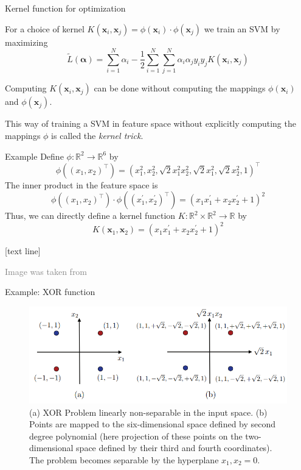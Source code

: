 \documentclass[dvipsnames]{beamer}
\newcommand{\referencefootnote}[1]{\setbeamertemplate{footline}[text line]{%
\parbox{0.9\paperwidth}{\vspace*{-23pt}\tiny{\textcolor{gray}{#1}}\hfill\scriptsize\insertframenumber}}}
\begin{document}
			\begin{frame}{Kernel function for optimization}
			
			For a choice of kernel $K(\mathbf{x}_i,\mathbf{x}_j) = \phi(\mathbf{x}_i)\cdot \phi(\mathbf{x}_j)$ we train an SVM by maximizing
       			\[
			\widetilde{L}(\boldsymbol{\alpha}) = \sum_{i=1}^N\alpha_i - \frac{1}{2}\sum_{i=1}^N\sum_{j=1}^N\alpha_i\alpha_j y_i y_j K(\mathbf{x}_i,\mathbf{x}_j)
			\]
			
			Computing $K(\mathbf{x}_i,\mathbf{x}_j)$ can be done without computing the mappings $\phi(\mathbf{x}_i)$ and $\phi(\mathbf{x}_j)$.
			
			This way of training a SVM in feature space without explicitly computing the mappings $\phi$ is called the \emph{kernel trick}. 
			\end{frame}
			
			\begin{frame}{Example}
        Define $\phi:\mathbb{R}^2 \rightarrow \mathbb{R}^6$ by
				\[
				\phi((x_1,x_2)^{\top}) = (x_1^2,x_2^2,\sqrt{2}x_1^2 x_2^2, \sqrt{2}x_1^2,\sqrt{2}x_2^2, 1)^{\top}
				\]
				The inner product in the feature space is
				\[
				\phi((x_1,x_2)^{\top})\cdot \phi((x^{'}_1,x^{'}_2)^{\top}) = (x_1 x_1^{'} + x_2 x_2^{'}+ 1)^2
				\]
				Thus, we can directly define a kernel function $K:\mathbb{R}^2 \times \mathbb{R}^2 \rightarrow \mathbb{R}$ by
				\[
				K(\mathbf{x}_1,\mathbf{x}_2) = (x_1 x_1^{'} + x_2 x_2^{'}+ 1)^2
				\]
			\end{frame}
			
			{ \referencefootnote{Image was taken from \cite{mohri_fom}}
			\begin{frame}{Example: XOR function}
        \begin{figure}
					\center
					\includegraphics[scale=.5]{figures/xor.png}
           \caption{(a) XOR Problem linearly non-separable in the input space. (b) Points are mapped to the six-dimensional space defined by second degree polynomial (here projection of these points on the two-dimensional space defined by their third and fourth coordinates). The problem becomes separable by the hyperplane $x_1,x_2 = 0$.}
        \end{figure}
			\end{frame}
			}
			
\end{document}
